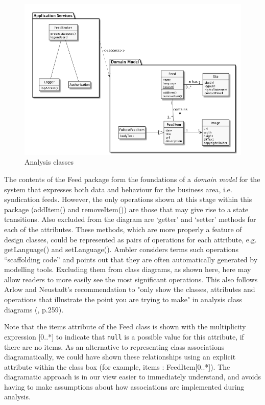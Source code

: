 \documentclass[runningheads,a4paper]{llncs}
\begin{document}
\begin{figure}
\centering
\includegraphics[width=\textwidth]{analysis-classes}
\caption{Analysis classes}
\label{fig:analysis-classes-diagram}
\end{figure}

The contents of the \textsf{Feed} package form the foundations of a \textit{domain model} \cite{fowler2003} for the system that expresses both data and behaviour for the business area, i.e. syndication feeds. However, the only operations shown at this stage within this package (\textsf{addItem()} and \textsf{removeItem()}) are those that may give rise to a state transitions. Also excluded from the diagram are `getter' and `setter' methods for each of the attributes. These methods, which are more properly a feature of design classes, could be represented as pairs of operations for each attribute, e.g. \textsf{getLanguage()} and \textsf{setLanguage()}. Ambler \cite{ambler} considers terms such operations ``scaffolding code'' and points out that they are often automatically generated by modelling tools. Excluding them from class diagrams, as shown here, here may allow readers to more easily see the most significant operations. This also follows Arlow and Neustadt's recommendation to "only show the classes, attributes and operations that illustrate the point you are trying to make" in analysis class diagrams (\cite{arlow}, p.259).

Note that the \textsf{items} attribute of the \textsf{Feed} class is shown with the multiplicity expression \textsf{[0..*]} to indicate that \texttt{null} is a possible value for this attribute, if there are no items. As an alternative to representing class associations diagramatically, we could have shown these relationships using an explicit attribute within the class box (for example, \textsf{items : FeedItem[0..*]}). The diagramatic approach is in our view easier to immediately understand, and avoids having to make assumptions about how associations are implemented during analysis.
\end{document}
